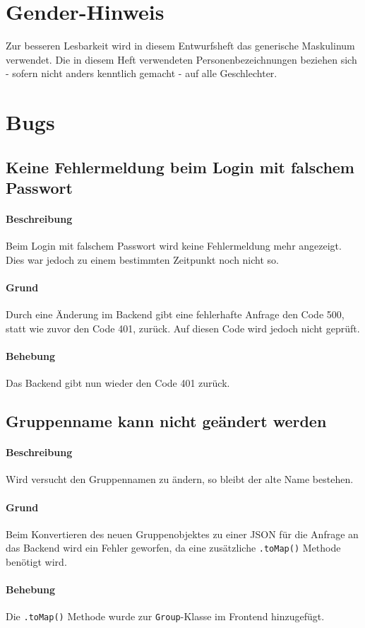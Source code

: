 \documentclass{qualitätssicherungsheft}
\begin{document}

\maketitle
\tableofcontents
\newpage

\section*{Gender-Hinweis}
Zur besseren Lesbarkeit wird in diesem Entwurfsheft das generische Maskulinum verwendet.
Die in diesem Heft verwendeten Personenbezeichnungen beziehen sich - sofern nicht anders kenntlich gemacht - auf alle Geschlechter.
\newpage
\section{Bugs}
\subsection{Keine Fehlermeldung beim Login mit falschem Passwort}
\paragraph*{Beschreibung} Beim Login mit falschem Passwort wird keine Fehlermeldung mehr angezeigt. Dies war jedoch zu einem bestimmten Zeitpunkt noch nicht so.
\paragraph{Grund} Durch eine Änderung im Backend 
gibt eine fehlerhafte Anfrage den Code 500, statt wie zuvor den Code 401, zurück. Auf diesen Code wird jedoch nicht geprüft.
\paragraph{Behebung} Das Backend gibt nun wieder den Code 401 zurück.
\newpage
\subsection{Gruppenname kann nicht geändert werden}
\paragraph*{Beschreibung} Wird versucht den Gruppennamen zu ändern, so bleibt der alte Name bestehen.
\paragraph{Grund} Beim Konvertieren des neuen Gruppenobjektes zu einer JSON für die Anfrage an das Backend wird ein Fehler geworfen, da eine zusätzliche \texttt{.toMap()} Methode benötigt wird.
\paragraph{Behebung} Die \texttt{.toMap()} Methode wurde zur \texttt{Group}-Klasse im Frontend hinzugefügt.
\end{document}
